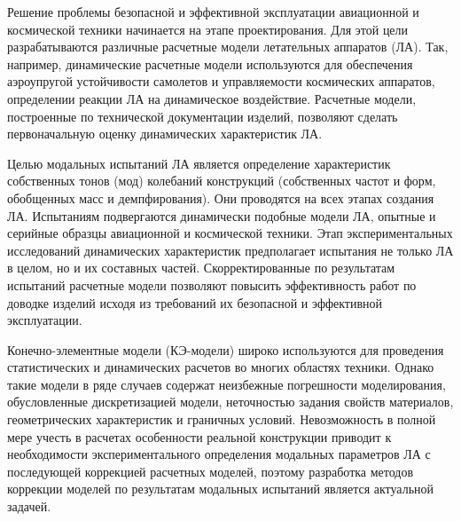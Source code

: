 
{\actuality} 

Решение проблемы безопасной и эффективной эксплуатации авиационной и космической техники начинается на этапе проектирования. Для этой цели разрабатываются различные расчетные модели летательных аппаратов (ЛА). Так, например, динамические расчетные модели используются для обеспечения аэроупругой устойчивости самолетов и управляемости космических аппаратов, определении реакции ЛА на динамическое воздействие. Расчетные модели, построенные по технической документации изделий, позволяют сделать первоначальную оценку динамических характеристик ЛА. 

Целью модальных испытаний ЛА является определение характеристик собственных тонов (мод) колебаний конструкций (собственных частот и форм, обобщенных масс и демпфирования). Они проводятся на всех этапах создания ЛА. Испытаниям подвергаются динамически подобные модели ЛА, опытные и серийные образцы авиационной и космической техники. Этап экспериментальных исследований динамических характеристик предполагает испытания не только ЛА в целом, но и их составных частей. Скорректированные по результатам испытаний расчетные модели позволяют повысить эффективность работ по доводке изделий исходя из требований их безопасной и эффективной эксплуатации. 

Конечно-элементные модели (КЭ-модели) широко используются для проведения статистических и динамических расчетов во многих областях техники. Однако такие модели в ряде случаев содержат неизбежные погрешности моделирования, обусловленные дискретизацией модели, неточностью задания свойств материалов, геометрических характеристик и граничных условий. Невозможность в полной мере учесть в расчетах особенности реальной конструкции приводит к необходимости экспериментального определения модальных параметров ЛА с последующей коррекцией расчетных моделей, поэтому разработка методов коррекции моделей по результатам модальных испытаний является актуальной задачей. 

{\progress}

